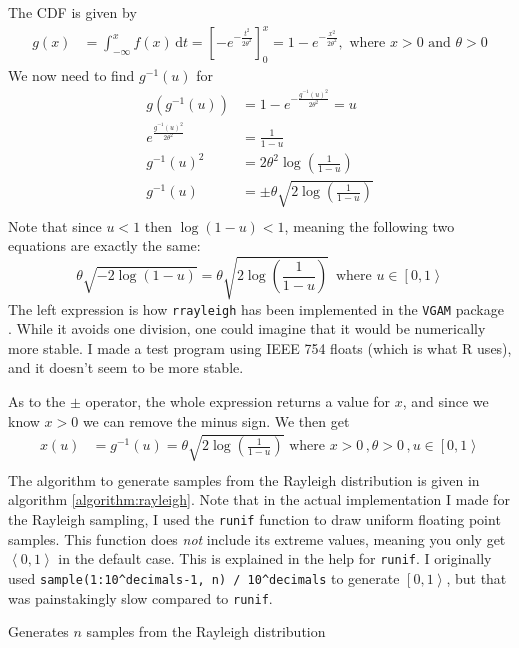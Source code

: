 \documentclass[a4paper,english,12pt]{article}
\begin{document}
The CDF is given by
\begin{align*}
  g(x) & = \int_{-\infty}^{x} f(x)\, \mathrm{d}t 
     = \left[ -e^{-\frac{t^2}{2\theta^2}} \right]_0^{x} = 
     1 - e^{-\frac{x^2}{2\theta^2}}, \text{ where } x>0 \text{ and } \theta > 0
\end{align*}
We now need to find $g^{-1}(u)$ for
\begin{align*}
  g(g^{-1}(u)) &= 1 - e^{-\frac{g^{-1}(u)^2}{2\theta^2}} = u \\
   e^\frac{g^{-1}(u)^2}{2\theta^2}  &= \frac{1}{1 - u} \\
   g^{-1}(u)^2  &= 2\theta^2\log{\left(\frac{1}{1 - u}\right)} \\
   g^{-1}(u)  &= \pm\theta\sqrt{2\log{\left(\frac{1}{1 - u}\right)}} \\
\end{align*}
Note that since $u<1$ then $\log{(1-u)} < 1$, meaning the following two
equations are exactly the same:
\[
  \theta\sqrt{-2\log{(1-u)}} = \theta\sqrt{2\log{\left(\frac{1}{1-u}\right)}}\,
  \text{ where } u \in \left[0,1\right>
\]
The left expression is how \texttt{rrayleigh} has been implemented in the
\texttt{VGAM} package \cite{github:vgam}. While it avoids one division, one
could imagine that it would be numerically more stable. I made a test program
using IEEE 754 floats \cite{1985--ieee754} (which is what R uses), and it
doesn't seem to be more stable.

As to the $\pm$ operator, the whole expression returns a value for $x$, and
since we know $x>0$ we can remove the minus sign. We then get
\begin{align*}
  x(u) &= g^{-1}(u) = \theta\sqrt{2\log{\left(\frac{1}{1 - u}\right)}}
   \text{ where } x>0\, , \theta>0\, , u \in \left[0,1\right>
   \\
\end{align*}%
The algorithm to generate samples from the Rayleigh distribution is given in
algorithm \vref{algorithm:rayleigh}. Note that in the actual implementation I
made for the Rayleigh sampling, I used the \texttt{runif} function to draw
uniform floating point samples. This function does \textit{not} include its
extreme values, meaning you only get $\left<0,1\right>$ in the default case.
This is explained in the help for \texttt{runif}. I originally used
\texttt{sample(1:10\^{}decimals-1, n) / 10\^{}decimals} to generate
$\left[0,1\right>$, but that was painstakingly slow compared to \texttt{runif}.

\begin{algorithm}
  \caption{Generates $n$ samples from the Rayleigh distribution}
  \label{algorithm:rayleigh}
  \begin{algorithmic}[1]
         \Comment{Random float $u \in \left[0,1\right>$}
      \EndFor
        \State {}
    \EndFunction
  \end{algorithmic}
\end{algorithm}
\end{document}

